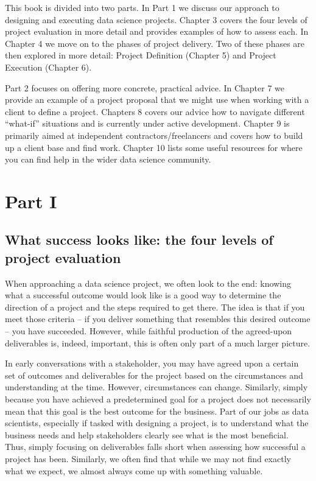 \documentclass[
]{book}
\begin{document}
This book is divided into two parts. In Part 1 we discuss our approach to designing and executing data science projects. Chapter 3 covers the four levels of project evaluation in more detail and provides examples of how to assess each. In Chapter 4 we move on to the phases of project delivery. Two of these phases are then explored in more detail: Project Definition (Chapter 5) and Project Execution (Chapter 6).

Part 2 focuses on offering more concrete, practical advice. In Chapter 7 we provide an example of a project proposal that we might use when working with a client to define a project. Chapters 8 covers our advice how to navigate different ``what-if'' situations and is currently under active development. Chapter 9 is primarily aimed at independent contractors/freelancers and covers how to build up a client base and find work. Chapter 10 lists some useful resources for where you can find help in the wider data science community.

\hypertarget{part-part-i}{%
\part*{Part I}\label{part-part-i}}

\hypertarget{levels}{%
\chapter{What success looks like: the four levels of project evaluation}\label{levels}}

When approaching a data science project, we often look to the end: knowing what a successful outcome would look like is a good way to determine the direction of a project and the steps required to get there. The idea is that if you meet those criteria -- if you deliver something that resembles this desired outcome -- you have succeeded. However, while faithful production of the agreed-upon deliverables is, indeed, important, this is often only part of a much larger picture.

In early conversations with a stakeholder, you may have agreed upon a certain set of outcomes and deliverables for the project based on the circumstances and understanding at the time. However, circumstances can change. Similarly, simply because you have achieved a predetermined goal for a project does not necessarily mean that this goal is the best outcome for the business. Part of our jobs as data scientists, especially if tasked with designing a project, is to understand what the business needs and help stakeholders clearly see what is the most beneficial. Thus, simply focusing on deliverables falls short when assessing how successful a project has been. Similarly, we often find that while we may not find exactly what we expect, we almost always come up with something valuable.
\end{document}
